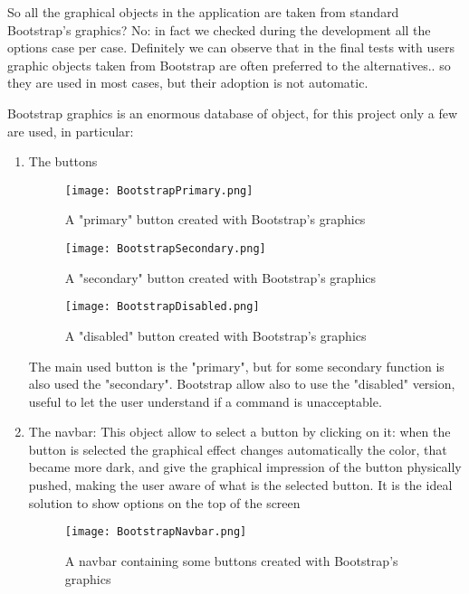 So all the graphical objects in the application are taken from standard Bootstrap's graphics? No: in fact we checked during the development all the options case per case. Definitely we can observe that in the final tests with users graphic objects taken from Bootstrap are often preferred to the alternatives.. so they are used in most cases, but their adoption is not automatic.  

Bootstrap graphics is an enormous database of object, for this project only a few are used, in particular:

\begin{enumerate}

\item The buttons

\begin{figure}[H]
\centering
\texttt{[image: BootstrapPrimary.png]} 
\caption{A "primary" button created with Bootstrap's graphics}
\end{figure}

\begin{figure}[H]
\centering
\texttt{[image: BootstrapSecondary.png]} 
\caption{A "secondary" button created with Bootstrap's graphics}
\end{figure}

\begin{figure}[H]
\centering
\texttt{[image: BootstrapDisabled.png]} 
\caption{A "disabled" button created with Bootstrap's graphics}
\end{figure}

The main used button is the "primary", but for some secondary function is also used the "secondary". Bootstrap allow also to use the "disabled" version, useful to let the user understand if a command is unacceptable.
 

\item The navbar:
This object allow to select a button by clicking on it: when the button is selected the graphical effect changes automatically the color, that became more dark, and give the graphical impression of the button physically pushed, making the user aware of what is the selected button. It is the ideal solution to show options on the top of the screen

\begin{figure}[H]
\centering
\texttt{[image: BootstrapNavbar.png]} 
\caption{A navbar containing some buttons created with Bootstrap's graphics}
\end{figure}


\end{enumerate}
